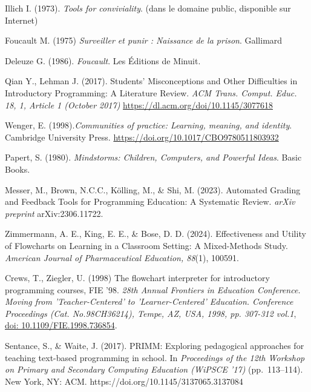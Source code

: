 

\begin{thebibliography}{99}

 Illich I. (1973). \textit{Tools for conviviality}. (dans le domaine public, disponible sur Internet)

 Foucault M. (1975)  \textit{Surveiller et punir : Naissance de la prison}.  Gallimard

 Deleuze G. (1986). \textit{Foucault}. Les Éditions de Minuit.

Qian Y., Lehman J. (2017). Students’ Misconceptions and Other Difficulties in Introductory Programming: A Literature Review. \textit{ACM Trans. Comput. Educ. 18, 1, Article 1 (October 2017)} \url{https://dl.acm.org/doi/10.1145/3077618}

Wenger, E. (1998).\textit{Communities of practice: Learning, meaning, and identity}. Cambridge University Press. \url{https://doi.org/10.1017/CBO9780511803932}

 Papert, S. (1980). \textit{Mindstorms: Children, Computers, and Powerful Ideas}. Basic Books.

Messer, M., Brown, N.C.C., Kölling, M., \& Shi, M. (2023). Automated Grading 
and Feedback Tools for Programming Education: A Systematic Review. \textit{arXiv preprint} 
arXiv:2306.11722.

 Zimmermann, A. E., King, E. E., \& Bose, D. D. (2024). Effectiveness 
and Utility of Flowcharts on Learning in a Classroom Setting: A Mixed-Methods Study. 
\textit{American Journal of Pharmaceutical Education, 88}(1), 100591.


Crews, T., Ziegler, U. (1998) The flowchart interpreter for introductory programming courses, FIE '98. \textit{28th Annual Frontiers in Education Conference. Moving from 'Teacher-Centered' to 'Learner-Centered' Education. Conference Proceedings (Cat. No.98CH36214), Tempe, AZ, USA, 1998, pp. 307-312 vol.1}, \url{doi: 10.1109/FIE.1998.736854}.


Sentance, S., \& Waite, J. (2017).
PRIMM: Exploring pedagogical approaches for teaching text-based programming in school.
In \textit{Proceedings of the 12th Workshop on Primary and Secondary Computing Education (WiPSCE '17)} (pp.~113--114).
New York, NY: ACM.
https://doi.org/10.1145/3137065.3137084


\end{thebibliography}
